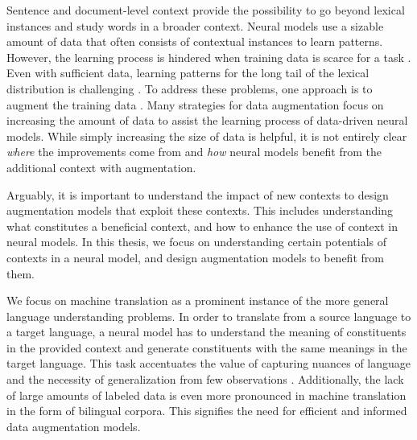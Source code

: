 \noindent Sentence and document-level context provide the possibility to go beyond lexical instances and study words in a broader context.
Neural models use a sizable amount of data that often consists of contextual instances to learn patterns.
However, the learning process is hindered when training data is scarce for a task \citep{45801,edunov-etal-2018-understanding}.
Even with sufficient data, learning patterns for the long tail of the lexical distribution is challenging \citep{NIPS2017_7278}. 
To address these problems, one approach is to augment the training data \citep{sennrich-haddow-birch:2016:P16-11}.
Many strategies for data augmentation focus on increasing the amount of data to assist the learning process of data-driven neural models.
While simply increasing the size of data is helpful, it is not entirely clear \textit{where} the improvements come from and \textit{how} neural models benefit from the additional context with augmentation. 

Arguably, it is important to understand the impact of new contexts to design augmentation models that exploit these contexts.
This includes understanding what constitutes a beneficial context, and how to enhance the use of context in neural models.
In this thesis, we focus on understanding certain potentials of contexts in a neural model, and design augmentation models to benefit from them. 

We focus on machine translation as a prominent instance of the more general language understanding problems. 
In order to translate from a source language to a target language, a neural model has to understand the meaning of constituents in the provided context and generate constituents with the same meanings in the target language.
This task accentuates the value of capturing nuances of language and the necessity of generalization from few observations \citep{DBLP:journals/corr/abs-2004-02181}.
Additionally, the lack of large amounts of labeled data is even more pronounced in machine translation in the form of bilingual corpora.
This signifies the need for efficient and informed data augmentation models.

